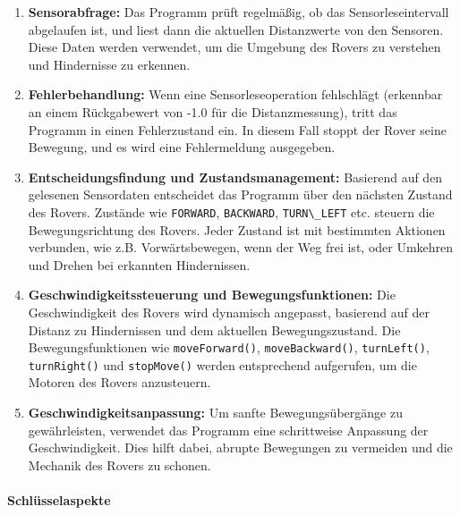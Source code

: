 \documentclass{vorlage-design-main}
\begin{document}
\begin{enumerate}
\def\labelenumi{\arabic{enumi}.}
\item
  \textbf{Sensorabfrage:} Das Programm prüft regelmäßig, ob das
  Sensorleseintervall abgelaufen ist, und liest dann die aktuellen
  Distanzwerte von den Sensoren. Diese Daten werden verwendet, um die
  Umgebung des Rovers zu verstehen und Hindernisse zu erkennen.
\item
  \textbf{Fehlerbehandlung:} Wenn eine Sensorleseoperation fehlschlägt
  (erkennbar an einem Rückgabewert von -1.0 für die Distanzmessung),
  tritt das Programm in einen Fehlerzustand ein. In diesem Fall stoppt
  der Rover seine Bewegung, und es wird eine Fehlermeldung ausgegeben.
\item
  \textbf{Entscheidungsfindung und Zustandsmanagement:} Basierend auf
  den gelesenen Sensordaten entscheidet das Programm über den nächsten
  Zustand des Rovers. Zustände wie \verb|FORWARD|,
  \verb|BACKWARD|,
  \verb|TURN\_LEFT| etc. steuern die
  Bewegungsrichtung des Rovers. Jeder Zustand ist mit bestimmten
  Aktionen verbunden, wie z.B. Vorwärtsbewegen, wenn der Weg frei ist,
  oder Umkehren und Drehen bei erkannten Hindernissen.
\item
  \textbf{Geschwindigkeitssteuerung und Bewegungsfunktionen:} Die
  Geschwindigkeit des Rovers wird dynamisch angepasst, basierend auf der
  Distanz zu Hindernissen und dem aktuellen Bewegungszustand. Die
  Bewegungsfunktionen wie \verb|moveForward()|,
  \verb|moveBackward()|,
  \verb|turnLeft()|,
  \verb|turnRight()| und
  \verb|stopMove()| werden entsprechend aufgerufen,
  um die Motoren des Rovers anzusteuern.
\item
  \textbf{Geschwindigkeitsanpassung:} Um sanfte Bewegungsübergänge zu
  gewährleisten, verwendet das Programm eine schrittweise Anpassung der
  Geschwindigkeit. Dies hilft dabei, abrupte Bewegungen zu vermeiden und
  die Mechanik des Rovers zu schonen.
\end{enumerate}

\hypertarget{schluxfcsselaspekte}{%
\paragraph{Schlüsselaspekte}\label{schluesselaspekte}}
\end{document}
